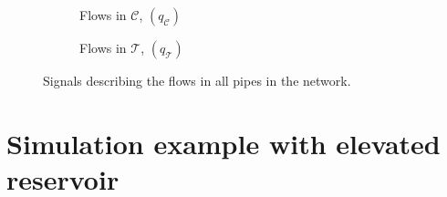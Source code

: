 \begin{figure}[H]
\centering
\begin{subfigure}{.49\textwidth}
\centering
   
  \caption{Flows in $\mathcal{C}$, $(q_{\mathcal{C}})$}
  \label{fig:sub31_example1}
\end{subfigure}
\begin{subfigure}{.49\textwidth}
\centering
   
  \caption{Flows in $\mathcal{T}$, $(q_{\mathcal{T}})$}
  \label{fig:sub31_example1}
\end{subfigure}
\caption{Signals describing the flows in all pipes in the network.}
\label{fig:flows_C_T}
\end{figure}



\section{Simulation example with elevated reservoir}
\label{multi_inlet_network_example_WT}







